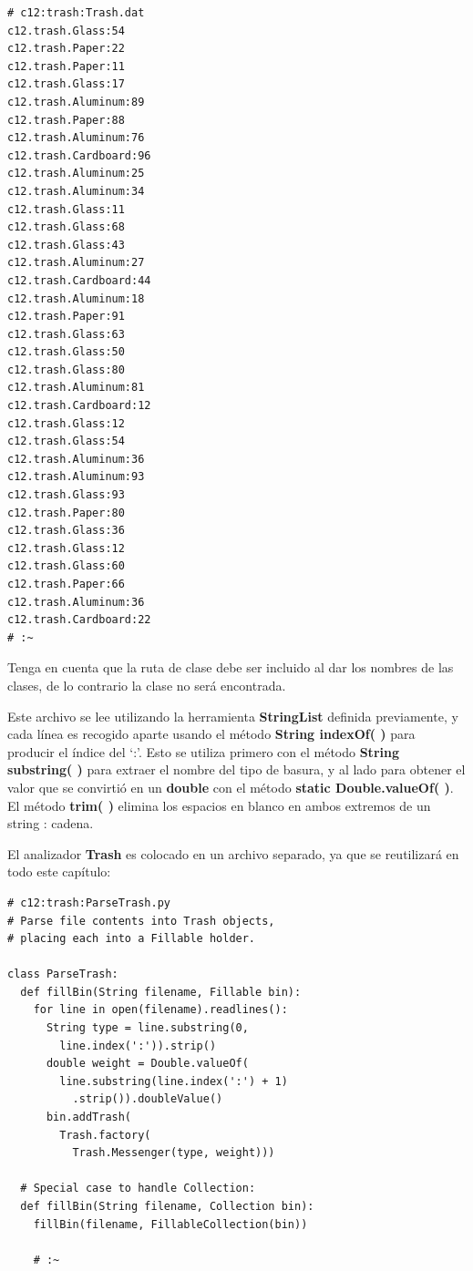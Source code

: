 \documentclass{article}
\begin{document}
\begin{lstlisting} 
# c12:trash:Trash.dat 
c12.trash.Glass:54 
c12.trash.Paper:22 
c12.trash.Paper:11 
c12.trash.Glass:17 
c12.trash.Aluminum:89 
c12.trash.Paper:88 
c12.trash.Aluminum:76 
c12.trash.Cardboard:96 
c12.trash.Aluminum:25 
c12.trash.Aluminum:34 
c12.trash.Glass:11 
c12.trash.Glass:68 
c12.trash.Glass:43 
c12.trash.Aluminum:27 
c12.trash.Cardboard:44 
c12.trash.Aluminum:18 
c12.trash.Paper:91 
c12.trash.Glass:63 
c12.trash.Glass:50 
c12.trash.Glass:80 
c12.trash.Aluminum:81 
c12.trash.Cardboard:12 
c12.trash.Glass:12 
c12.trash.Glass:54 
c12.trash.Aluminum:36 
c12.trash.Aluminum:93 
c12.trash.Glass:93 
c12.trash.Paper:80 
c12.trash.Glass:36 
c12.trash.Glass:12 
c12.trash.Glass:60 
c12.trash.Paper:66 
c12.trash.Aluminum:36 
c12.trash.Cardboard:22 
# :~ 
\end{lstlisting}

Tenga en cuenta que la ruta de clase debe ser incluido al dar los nombres de las clases, de lo contrario la clase no será encontrada.\newline

Este archivo se lee utilizando la herramienta \textbf{StringList} definida previamente, y cada línea es recogido aparte usando el método \textbf{String indexOf( )} para producir el índice del ‘:’. Esto se utiliza primero con el método \textbf{String substring( )} para extraer el nombre del tipo de basura,  y al lado para obtener el valor que se convirtió en un \textbf{double} con el método \textbf{static Double.valueOf( )}. El método \textbf{trim( )}  elimina los espacios en blanco en ambos extremos de un string : cadena. \newline

El analizador \textbf{Trash } es colocado en un archivo separado, ya que se reutilizará en todo este capítulo: \newline

\begin{lstlisting} 
# c12:trash:ParseTrash.py  
# Parse file contents into Trash objects, 
# placing each into a Fillable holder. 

class ParseTrash: 
  def fillBin(String filename, Fillable bin): 
    for line in open(filename).readlines(): 
      String type = line.substring(0,  
        line.index(':')).strip() 
      double weight = Double.valueOf( 
        line.substring(line.index(':') + 1) 
          .strip()).doubleValue() 
      bin.addTrash( 
        Trash.factory( 
          Trash.Messenger(type, weight))) 
          
  # Special case to handle Collection: 
  def fillBin(String filename, Collection bin): 
    fillBin(filename, FillableCollection(bin)) 
    
    # :~
\end{lstlisting}
\end{document}
